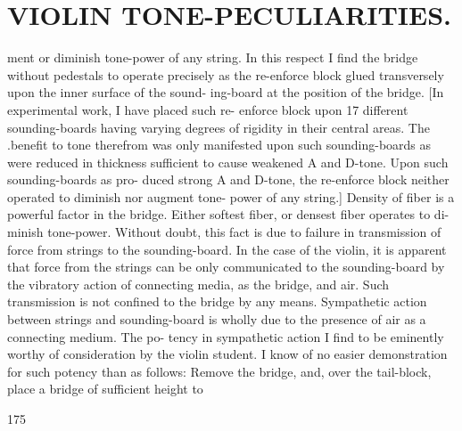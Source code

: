 \documentclass{article}
\begin{document}
\section*{VIOLIN TONE-PECULIARITIES.}
ment or diminish tone-power of any string. In this respect I find the bridge without pedestals to operate precisely as the re-enforce block glued transversely upon the inner surface of the sound- ing-board at the position of the bridge. [In experimental work, I have placed such re- enforce block upon 17 different sounding-boards having varying degrees of rigidity in their central areas. The .benefit to tone therefrom was only manifested upon such sounding-boards as were reduced in thickness sufficient to cause weakened A and D-tone. Upon such sounding-boards as pro- duced strong A and D-tone, the re-enforce block neither operated to diminish nor augment tone- power of any string.] Density of fiber is a powerful factor in the bridge. Either softest fiber, or densest fiber operates to di- minish tone-power. Without doubt, this fact is due to failure in transmission of force from strings to the sounding-board. In the case of the violin, it is apparent that force from the strings can be only communicated to the sounding-board by the vibratory action of connecting media, as the bridge, and air. Such transmission is not confined to the bridge by any means. Sympathetic action between strings and sounding-board is wholly due to the presence of air as a connecting medium. The po- tency in sympathetic action I find to be eminently worthy of consideration by the violin student. I know of no easier demonstration for such potency than as follows: Remove the bridge, and, over the tail-block, place a bridge of sufficient height to

175
\end{document}
